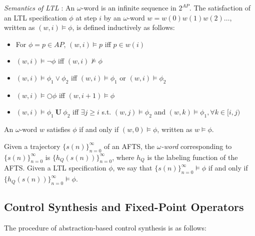 {\color{black}\emph{Semantics of LTL} \cite{Nilsson2017}:} An $\omega$-word is an infinite sequence in $ 2^{AP}$.  The satisfaction of an LTL specification $ \phi $ at step $i$ by an $\omega$-word $ w = w(0)w(1)w(2)\dots $, written as $ (w,i) \models \phi $, is defined inductively as follows:
\begin{itemize}
	\item For $ \phi = p \in AP $, $ (w,i)\models p $ iff $ p\in w(i) $ 
	\item $ (w,i)\models \neg \phi $ iff $ (w,i)\not\models \phi $
	\item $ (w,i)\models  \phi_1 \vee \phi_2 $ iff $ (w,i)\models \phi_1 $ or $ (w,i)\models \phi_2 $
	\item $ (w,i) \models \bigcirc \phi $ iff $ (w,i+1) \models \phi $
	\item $ (w,i)\models \phi_1 \mathbf{\ U\ } \phi_2 $ iff $\exists j\geq i  $ s.t. $ (w,j)\models \phi_2 $ and $ (w,k)\models \phi_1, \forall k\in [i,j) $
\end{itemize} 

An $\omega$-word $ w $ satisfies $ \phi $ if and only if $ (w,0)\models \phi $, written as $ w \models \phi $. 


{\color{black} Given a trajectory $\{s(n)\}_{n=0}^{\infty} $ }
of an AFTS, the \textit{$\omega$-word} corresponding to {\color{black} $\{s(n)\}_{n=0}^{\infty} $} is {\color{black} $\{h_Q(s(n))\}_{n=0}^{\infty}$}, where $ h_Q $ is the labeling function of the AFTS.  Given a LTL specification $ \phi $, we say that {\color{black} $\{s(n)\}_{n=0}^{\infty} \models \phi $} if and only if {\color{black} $\{h_Q(s(n))\}_{n=0}^{\infty} \models \phi $}.

\subsection{Control Synthesis and Fixed-Point Operators}
\label{sec:contsyn}
\iffalse
The procedure of abstraction-based control synthesis is as follows: 

